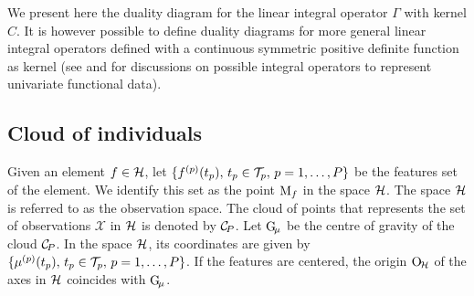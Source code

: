 \begin{remark}\label{rem:rhks}
We present here the duality diagram for the linear integral operator $\Gamma$ with kernel $C$. It is however possible to define duality diagrams for more general linear integral operators defined with a continuous symmetric positive definite function as kernel (see \cite{gonzalezRepresentingFunctionalData2010} and \cite{wongNonparametricOperatorregularizedCovariance2019a} for discussions on possible integral operators to represent univariate functional data).
\end{remark}

\subsection{Cloud of individuals} %
\label{sub:cloud_of_individuals}

Given an element $f \in \mathcal{H}$, let $\{f^{(p)}(t_p),\,t_p \in \mathcal{T}_{p},\,p = 1, \dots, P\}$ be the features set of the element. We identify this set as the point $\mathrm{M}_f$ in the space $\mathcal{H}$. The space $\mathcal{H}$ is referred to as the observation space. The cloud of points that represents the set of observations $\mathcal{X}$ in $\mathcal{H}$ is denoted by $\mathcal{C}_{\!P}$. Let $\mathrm{G}_{\!\mu}$ be the centre of gravity of the cloud $\mathcal{C}_{\!P}$. In the space $\mathcal{H}$, its coordinates are given by $\{\mu^{(p)}(t_p),\,t_p \in \mathcal{T}_{p},\,p = 1, \dots, P\}$. If the features are centered, the origin $\mathrm{O}_{\!\mathcal{H}}$ of the axes in $\mathcal{H}$ coincides with $\mathrm{G}_{\!\mu}$.

